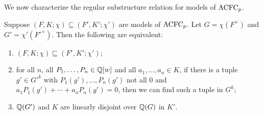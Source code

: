 \begin{comment}
Case 2: the element $f$ and $E$ are multiplicatively dependent.
Choose the least natural number $n$ so that $f^n$ is equal to a monomial in $E$. Extend $\rho$ by mapping $f$ to any $n$-th root of the image of the monomial under the $\rho$. It is easy to see, that this extension is well-defined. This will induce a generic character on the group generated by $E$ and $f$ and thus contradicting to the maximality of the pair $(E,\rho)$.

This maximal element $(E,\rho)$ of $S$ will give us a character $\rho: F^{ac}\to L$ such that $(F^{ac},L;\rho)$ is a model of $\TNp$.
\end{proof}

\end{comment}


\noindent
We now characterize the regular substructure relation for models of $\mathrm{ACFC}_p$.

\begin{prop}\label{GenericSubstructure}
Suppose $(F,K;\chi) \subseteq (F',K';\chi')$ are models of $\mathrm{ACFC}_p$. Let $G= \chi(F^\times)$ and $G' = \chi'({F'}^\times)$. Then the following are equivalent:

\begin{enumerate}
\item $(F, K; \chi) \sqsubseteq (F', K';\chi')$;

\item for all $n$, all $P_1, \ldots, P_n \in \mathbb{Q}[w]$ and all $a_1, \ldots, a_n \in K$, if there is a tuple $g' \in {G'}^{k}$ with $P_1(g'), \ldots, P_n(g')$ not all $0$ and  $a_1P_1(g') + \cdots+ a_nP_n(g') =0$, then we can find such a tuple in $G^{k}$;

\item $\mathbb{Q}(G')$ and $K$ are linearly disjoint over $\mathbb{Q}(G)$ in $K'$.
\end{enumerate}

\end{prop}


